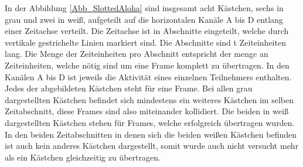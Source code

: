 In der Abbildung \ref{Abb_SlottedAloha} sind insgesamt acht Kästchen, sechs in grau und zwei in weiß, aufgeteilt auf die horizontalen Kanäle A bis D entlang einer Zeitachse verteilt. Die Zeitachse ist in Abschnitte eingeteilt, welche durch vertikale gestrichelte Linien markiert sind. Die Abschnitte sind t Zeiteinheiten lang. Die Menge der Zeiteinheiten pro Abschnitt entspricht der menge an Zeiteinheiten, welche nötig sind um eine Frame komplett zu übertragen. In den Kanälen A bis D ist jeweils die Aktivität eines einzelnen Teilnehmers enthalten. Jedes der abgebildeten Kästchen steht für eine Frame. Bei allen grau dargestellten Kästchen befindet sich mindestens ein weiteres Kästchen im selben Zeitabschnitt, diese Frames sind also miteinander kollidiert. Die beiden in weiß dargestellten Kästchen stehen für Frames, welche erfolgreich übertragen wurden. In den beiden Zeitabschnitten in denen sich die beiden weißen Kästchen befinden ist auch kein anderes Kästchen dargestellt, somit wurde auch nicht versucht mehr als ein Kästchen gleichzeitig zu übertragen.

